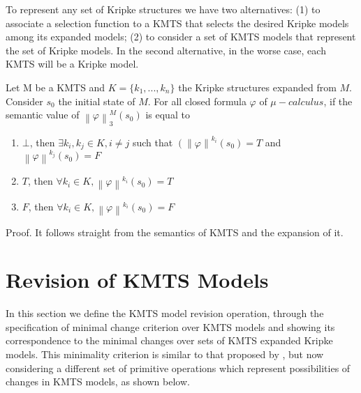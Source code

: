 \documentclass{llncs}
\begin{document}
To represent any set of Kripke structures we have two alternatives: (1) to associate a selection function to a KMTS that selects the desired Kripke models among its expanded models; (2) to consider a set of KMTS models that represent the set of Kripke models. In the second alternative, in the worse case, each KMTS will be a Kripke model.

\begin{proposition}\label{prpKMTSSem}
Let M be a KMTS and $K = \{k_{1},..., k_{n}\}$ the Kripke structures expanded from $M$. Consider $s_{0}$ the initial state of $M$. For all closed formula $\varphi$ of $\mu-calculus$, if the semantic value of $\left\|\varphi\right\|^{M}_{3}(s_{0})$ is equal to
\vspace*{-0.3cm}
\begin{enumerate}
\item $\bot$, then $\exists k_{i}, k_{j} \in K, i\neq j$ such that $\left(\|\varphi\right\|^{k_{i}}(s_{0}) = T$ and 
$\left\|\varphi\right\|^{k_{j}}(s_{0}) = F$
\item $T$, then $\forall k_{i} \in K, \left\|\varphi\right\|^{k_{i}}(s_{0}) = T$
\item $F$, then $\forall k_{i} \in K, \left\|\varphi\right\|^{k_{i}}(s_{0}) = F$
\end{enumerate}
Proof. It follows straight from the semantics of KMTS and the expansion of it. 
\end{proposition}

\vspace*{-0.6cm}
\section{Revision of KMTS Models}
\label{secRevKMTS}

In this section we define the KMTS model revision operation, through the specification of minimal change criterion over KMTS models and showing its correspondence to the minimal changes over sets of KMTS expanded Kripke models. This minimality criterion is similar to that proposed by \cite{Pau10}, but now considering a different set of primitive operations which represent possibilities of changes in KMTS models, as shown below.  
\end{document}
